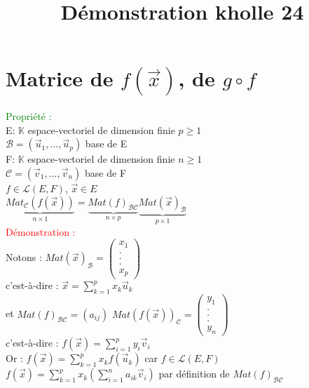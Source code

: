 \documentclass{article}
\begin{document}
\title{Démonstration kholle 24}
\date{}
\maketitle
\renewcommand{\thesection}{\Roman{section}}
	\setlength{\parindent}{1.5cm}
        \section{Matrice de $f(\vec x)$, de $g \circ f $}
        \textcolor{green}{Propriété :} \\
        E: $\mathbb K$ espace-vectoriel de dimension finie $p\geq 1$ \\
        $\mathcal B=(\vec u_1,...,\vec u_p)$ base de E \\
        F: $\mathbb K$ espace-vectoriel de dimension finie $n\geq 1$ \\
        $\mathcal C=(\vec v_1,...,\vec v_n)$ base de F \\
        $f \in \mathcal L (E,F)$, $\vec x \in E$ \\
        $\underbrace{Mat_{\mathcal{C}}(f(\vec x))}_{n\times 1} = \underbrace{Mat(f)_{\mathcal{BC}}}_{n\times p} \underbrace{Mat(\vec x)_{\mathcal B}}_{p \times 1}$ \\
        \textcolor{red}{Démonstration :} \\
        Notons : $Mat(\vec x)_{\mathcal B}= \begin{pmatrix} x_1 \\ . \\ .  \\ . \\ x_p \end{pmatrix}$ \\
        c'est-à-dire : $\vec x = \sum_{k=1}^p x_k \vec u_k$  \\
        et $Mat (f)_{\mathcal{BC}} = (a_{ij})$ $Mat (f(\vec x))_{\mathcal C} =\begin{pmatrix} y_1 \\ . \\ . \\ . \\ y_n \end{pmatrix}$ \\
        c'est-à-dire : $f(\vec x) = \sum_{i=1}^p y_i \vec v_i$ \\
        Or : $f(\vec x)= \sum_{k=1}^p x_k f(\vec u_k)$ car $f \in \mathcal L (E,F)$ \\
        $f(\vec x)= \sum_{k=1}^p x_k (\sum_{i=1}^n a_{ik} \vec v_i)$ par définition de $Mat(f)_{\mathcal{BC}}$  \\
\end{document}
